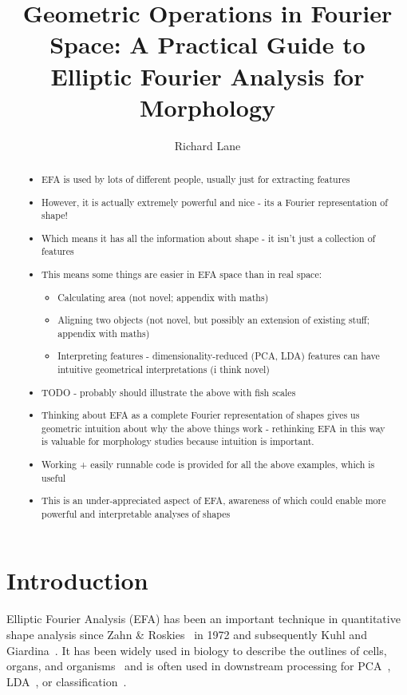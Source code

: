 \documentclass[11pt,a4paper,notitlepage]{article}
\author{Richard Lane}
\title{
	Geometric Operations in Fourier Space: A Practical Guide to Elliptic Fourier Analysis for Morphology
}
\begin{document}
\maketitle

\begin{abstract}
	\begin{itemize}
		\item EFA is used by lots of different people, usually just for extracting features
		\item However, it is actually extremely powerful and nice - its a Fourier representation of shape!
		\item Which means it has all the information about shape - it isn't just a collection of features
		\item This means some things are easier in EFA space than in real space:
		      \begin{itemize}
			      \item Calculating area (not novel; appendix with maths)
			      \item Aligning two objects (not novel, but possibly an extension of existing stuff; appendix with maths)
			      \item Interpreting features - dimensionality-reduced (PCA, LDA) features can have intuitive geometrical interpretations (i think novel)
		      \end{itemize}
		\item TODO - probably should illustrate the above with fish scales
		\item Thinking about EFA as a complete Fourier representation of shapes gives us geometric intuition about why the above things work -
		      rethinking EFA in this way is valuable for morphology studies because intuition is important.
		\item Working + easily runnable code is provided for all the above examples, which is useful
		\item This is an under-appreciated aspect of EFA, awareness of which could enable more powerful and interpretable analyses of shapes
	\end{itemize}
\end{abstract}

\section{Introduction}
Elliptic Fourier Analysis (EFA) has been an important technique in quantitative shape analysis
since Zahn \& Roskies~\cite{Zahn1972} in 1972 and subsequently Kuhl and Giardina~\cite{Kuhl1982}.
It has been widely used in biology to describe the outlines of cells, organs, and
organisms~\cite{Iwata2002,GAYO2023739948,Diaz1989,Jeong2007,Chitwood_Otoni_2017} and is often used
in downstream processing for
PCA~\cite{VifaraVega2025,Paige2025,SLEZAK2020107102},
LDA~\cite{Chitwood_Otoni_2017},
or classification~\cite{Ghanem2025}.
\end{document}
